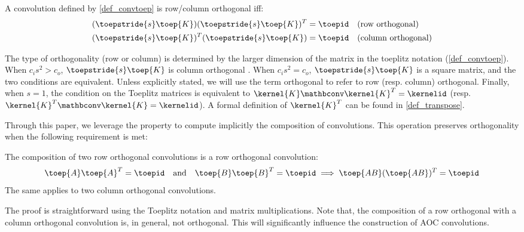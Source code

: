     \begin{definition}\label{def:orthogonal}  
        A convolution defined by \cref{def_convtoep} is row/column orthogonal iff:
        \begin{align*}
            (\toepstride{s} \toep{K})(\toepstride{s} \toep{K})^T = \toepid & \quad \text{(row orthogonal)} \\
            (\toepstride{s} \toep{K})^T(\toepstride{s} \toep{K}) = \toepid & \quad \text{(column orthogonal)}
        \end{align*}
    \end{definition}
        The type of orthogonality (row or column) is determined by the larger dimension of the matrix in the toeplitz notation (\cref{def_convtoep}). When $c_i s^2 > c_o$, $\toepstride{s} \toep{K}$ is column orthogonal \cite{achour2023existencestabilityscalabilityorthogonal}. When $c_i s^2 = c_o$, $\toepstride{s} \toep{K}$ is a square matrix, and the two conditions are equivalent. Unless explicitly stated, we will use the term orthogonal to refer to row (resp. column) orthogonal. Finally, when $s=1$, the condition on the Toeplitz matrices is equivalent to $\kernel{K} \mathbconv \kernel{K}^T = \kernelid$ (resp. $\kernel{K}^T \mathbconv \kernel{K} = \kernelid$). A formal definition of $\kernel{K}^T$ can be found in  \cref{def_transpose}.
    
    Through this paper, we leverage the \Bconv{} property to compute implicitly the composition of convolutions. This operation preserves orthogonality when the following requirement is met:
    
    \begin{proposition}\label{prop:composition_ortho}  
        The composition of two row orthogonal convolutions is a row orthogonal convolution:
        \[
            \toep{A} \toep{A}^T = \toepid \quad \text{and} \quad \toep{B} \toep{B}^T = \toepid \implies \toep{AB}(\toep{AB})^T = \toepid
        \]
        The same applies to two column orthogonal convolutions.
    \end{proposition}
    The proof is straightforward using the Toeplitz notation and matrix multiplications. Note that, the composition of a row orthogonal with a column orthogonal convolution is, in general, not orthogonal. This will significantly influence the construction of AOC convolutions.
